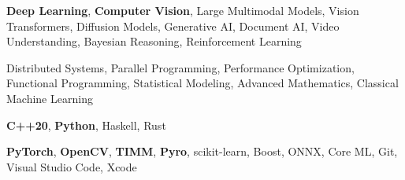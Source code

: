 
	\begin{keywords}
			{
				\textbf{Deep Learning},
				\textbf{Computer Vision},
				Large Multimodal Models,
				Vision Transformers,
				Diffusion Models,
				Generative AI,
				Document AI,
				Video Understanding,
				Bayesian Reasoning,
				Reinforcement Learning
			}

			{
				Distributed Systems,
				Parallel Programming,
				Performance Optimization,
				Functional Programming,
				Statistical Modeling,
				Advanced Mathematics,
				Classical Machine Learning
			}

			{
				\textbf{C++20},
				\textbf{Python},
				Haskell,
				Rust
			}

			{
				\textbf{PyTorch},
				\textbf{OpenCV},
				\textbf{TIMM},
				\textbf{Pyro},
				scikit-learn,
				Boost,
				ONNX,
				Core ML,
				Git,
				Visual Studio Code,
				Xcode
			}
	\end{keywords}
